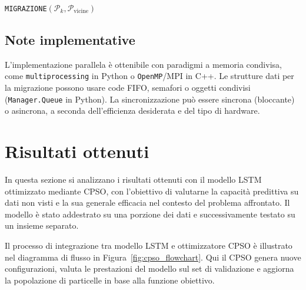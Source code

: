 \documentclass{article}
\begin{document}
\begin{algorithm}[H]
\caption{\texttt{MIGRAZIONE}$(\mathcal{P}_k, \mathcal{P}_{\text{vicine}})$}
\end{algorithm}

\subsection{Note implementative}

L'implementazione parallela è ottenibile con paradigmi a memoria condivisa, come 
\texttt{multiprocessing} in Python o \texttt{OpenMP}/MPI in C++. Le strutture dati per la migrazione 
possono usare code FIFO, semafori o oggetti condivisi (\texttt{Manager.Queue} in Python). 
La sincronizzazione può essere sincrona (bloccante) o asincrona, a seconda dell’efficienza desiderata e 
del tipo di hardware.

\section{Risultati ottenuti}

In questa sezione si analizzano i risultati ottenuti con il modello LSTM 
ottimizzato mediante CPSO, con l’obiettivo di valutarne la capacità predittiva 
su dati non visti e la sua generale efficacia nel contesto del problema affrontato. 
Il modello è stato addestrato su una porzione dei dati e successivamente testato 
su un insieme separato.

Il processo di integrazione tra modello LSTM e ottimizzatore CPSO è illustrato nel diagramma di flusso 
in Figura~\ref{fig:cpso_flowchart}. Qui il CPSO genera nuove configurazioni, valuta 
le prestazioni del modello sul set di validazione e aggiorna la popolazione di particelle 
in base alla funzione obiettivo.
\end{document}
